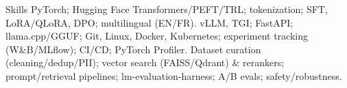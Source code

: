 
\begin{rubric}{Skills}
\noentry{~}
  PyTorch; Hugging Face Transformers/PEFT/TRL; tokenization; SFT, LoRA/QLoRA, DPO; multilingual (EN/FR).
  vLLM, TGI; FastAPI; llama.cpp/GGUF; Git, Linux, Docker, Kubernetes; experiment tracking (W\&B/MLflow); CI/CD; PyTorch Profiler.
  Dataset curation (cleaning/dedup/PII); vector search (FAISS/Qdrant) \& rerankers; prompt/retrieval pipelines; lm-evaluation-harness; A/B evals; safety/robustness.
\end{rubric}
